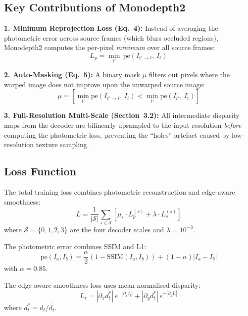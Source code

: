 \documentclass[10pt, a4paper, twocolumn]{article}
\begin{document}
\subsection{Key Contributions of Monodepth2}

\textbf{1. Minimum Reprojection Loss (Eq.~4):}
Instead of averaging the photometric error across source frames (which blurs occluded regions), Monodepth2 computes the per-pixel \emph{minimum} over all source frames:
\begin{equation}
L_p = \min_{t'} \, \text{pe}(I_{t'\to t}, \, I_t)
\label{eq:minreproj}
\end{equation}

\textbf{2. Auto-Masking (Eq.~5):}
A binary mask $\mu$ filters out pixels where the warped image does not improve upon the unwarped source image:
\begin{equation}
\mu = \left[\min_{t'} \text{pe}(I_{t'\to t},\, I_t) < \min_{t'} \text{pe}(I_{t'},\, I_t)\right]
\label{eq:automask}
\end{equation}

\textbf{3. Full-Resolution Multi-Scale (Section~3.2):}
All intermediate disparity maps from the decoder are bilinearly upsampled to the input resolution \emph{before} computing the photometric loss, preventing the ``holes'' artefact caused by low-resolution texture sampling.

\subsection{Loss Function}

The total training loss combines photometric reconstruction and edge-aware smoothness:
\begin{equation}
L = \frac{1}{|\mathcal{S}|} \sum_{s \in \mathcal{S}} \left[\mu_s \cdot L_p^{(s)} + \lambda \cdot L_s^{(s)}\right]
\label{eq:total_loss}
\end{equation}
where $\mathcal{S} = \{0,1,2,3\}$ are the four decoder scales and $\lambda = 10^{-3}$.

The photometric error combines SSIM and L1:
\begin{equation}
\text{pe}(I_a, I_b) = \frac{\alpha}{2}(1 - \text{SSIM}(I_a, I_b)) + (1-\alpha)|I_a - I_b|
\label{eq:pe}
\end{equation}
with $\alpha = 0.85$.

The edge-aware smoothness loss uses mean-normalised disparity:
\begin{equation}
L_s = |\partial_x d^*_t|\, e^{-|\partial_x I_t|} + |\partial_y d^*_t|\, e^{-|\partial_y I_t|}
\label{eq:smooth}
\end{equation}
where $d^*_t = d_t / \overline{d_t}$.
\end{document}
